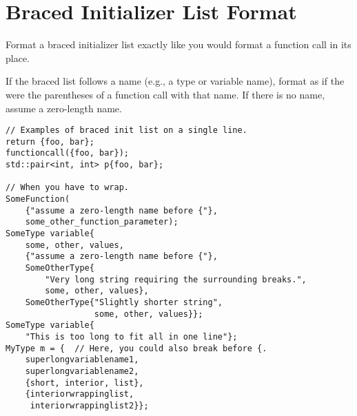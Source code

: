 
\section{Braced Initializer List Format}\label{sec:braced-initializer-list-format}
Format a braced initializer list exactly like you would format a function call in its place.

If the braced list follows a name (e.g., a type or variable name), format as if the \texttt{{}} were the parentheses of a function call with that name. If there is no name, assume a zero-length name.
\begin{verbatim}
// Examples of braced init list on a single line.
return {foo, bar};
functioncall({foo, bar});
std::pair<int, int> p{foo, bar};

// When you have to wrap.
SomeFunction(
    {"assume a zero-length name before {"},
    some_other_function_parameter);
SomeType variable{
    some, other, values,
    {"assume a zero-length name before {"},
    SomeOtherType{
        "Very long string requiring the surrounding breaks.",
        some, other, values},
    SomeOtherType{"Slightly shorter string",
                  some, other, values}};
SomeType variable{
    "This is too long to fit all in one line"};
MyType m = {  // Here, you could also break before {.
    superlongvariablename1,
    superlongvariablename2,
    {short, interior, list},
    {interiorwrappinglist,
     interiorwrappinglist2}};
\end{verbatim}
